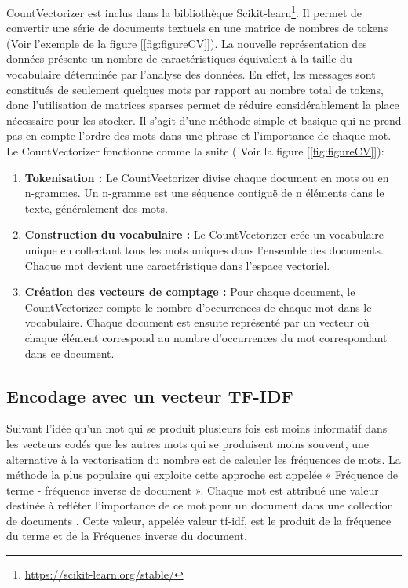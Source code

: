 CountVectorizer est inclus dans la bibliothèque Scikit-learn\footnote{\href{https://scikit-learn.org/stable/}{https://scikit-learn.org/stable/}}. Il permet de convertir une série de documents textuels en une matrice de nombres de tokens (Voir l'exemple de la figure [\ref{fig:figureCV}]).  La nouvelle représentation des données présente un nombre de caractéristiques équivalent à la taille du vocabulaire déterminée par l'analyse des données.
En effet, les messages sont constitués de seulement quelques mots par rapport au nombre total de tokens, donc l'utilisation de matrices sparses permet de réduire considérablement la place nécessaire pour les stocker.
Il s'agit d'une méthode simple et basique qui ne prend pas en compte l'ordre des mots dans une phrase et l'importance de chaque mot.
Le CountVectorizer fonctionne comme la suite ( Voir la figure [\ref{fig:figureCV}]): 
\begin{enumerate}
    \item \textbf{Tokenisation :} Le CountVectorizer divise chaque document en mots ou en n-grammes. Un n-gramme est une séquence contiguë de n éléments dans le texte, généralement des mots.
   
    \item \textbf{Construction du vocabulaire :} Le CountVectorizer crée un vocabulaire unique en collectant tous les mots uniques dans l'ensemble des documents. Chaque mot devient une caractéristique dans l'espace vectoriel.
   
    \item \textbf{Création des vecteurs de comptage :} Pour chaque document, le CountVectorizer compte le nombre d'occurrences de chaque mot dans le vocabulaire. Chaque document est ensuite représenté par un vecteur où chaque élément correspond au nombre d'occurrences du mot correspondant dans ce document.
\end{enumerate}



\subsection{Encodage avec un vecteur TF-IDF}
Suivant l'idée qu'un mot qui se produit plusieurs fois est moins informatif dans les vecteurs codés que les autres mots qui se produisent moins souvent, une alternative à la vectorisation du nombre est de calculer les fréquences de mots. La méthode la plus populaire qui exploite cette approche est appelée « Fréquence de terme - fréquence inverse de document ». Chaque mot est attribué une valeur destinée à refléter l'importance de ce mot pour un document dans une collection de documents \cite{leskovec2014mining}. Cette valeur, appelée valeur tf-idf, est le produit de la fréquence du terme et de la Fréquence inverse du document.

